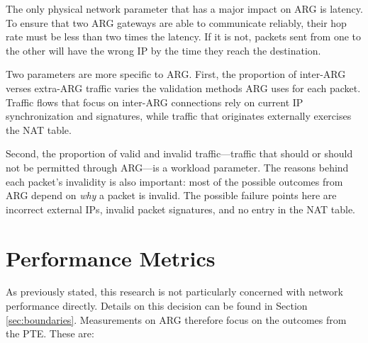 \par The only physical network parameter that has a major impact on \ac{ARG} is latency. To ensure that two \ac{ARG} gateways are able to communicate reliably, their hop rate must be less than two times the latency. If it is not, packets sent from one to the other will have the wrong \ac{IP} by the time they reach the destination. %

\par Two parameters are more specific to \ac{ARG}. First, the proportion of inter-\ac{ARG} verses extra-\ac{ARG} traffic varies the validation methods \ac{ARG} uses for each packet. Traffic flows that focus on inter-\ac{ARG} connections rely on current \ac{IP} synchronization and signatures, while traffic that originates externally exercises the \ac{NAT} table.

\par Second, the proportion of valid and invalid traffic---traffic that should or should not be permitted through \ac{ARG}---is a workload parameter. The reasons behind each packet's invalidity is also important: most of the possible outcomes from \ac{ARG} depend on \textit{why} a packet is invalid. The possible failure points here are incorrect external \acp{IP}, invalid packet signatures, and no entry in the \ac{NAT} table.

\section{Performance Metrics}
\label{sec:metrics}
\par As previously stated, this research is not particularly concerned with network performance directly. Details on this decision can be found in Section \ref{sec:boundaries}. Measurements on \ac{ARG} therefore focus on the outcomes from the \ac{PTE}.  These are:

